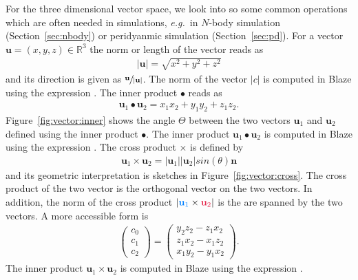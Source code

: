 \documentclass[11pt,fleqn]{book} %
\begin{document}
For the three dimensional vector space, we look into so some common operations which are often needed in simulations, \emph{e.g.}\ in $N$-body simulation (Section~\ref{sec:nbody}) or peridyanmic simulation (Section~\ref{sec:pd}). For a vector $\mathbf{u}=(x,y,z)\in\mathbb{R}^3$ the norm or length of the vector reads as
\begin{align}
\vert\mathbf{u}\vert = \sqrt{x^2+y^2+z^2}
\end{align}
and its direction is given as $\sfrac{\mathbf{u}}{\vert\mathbf{u}\vert}$. The norm of the vector $\vert c \vert$ is computed in Blaze using the expression . The inner product $\bullet$ reads as
\begin{align}
\mathbf{u}_1 \bullet \mathbf{u}_2 = x_1x_2 + y_1y_2 + z_1z_2\text{.}
\end{align}
Figure~\ref{fig:vector:inner} shows the angle $\Theta$ between the two vectors $\mathbf{u}_1$ and $\mathbf{u}_2$ defined using the inner product $\bullet$.  The inner product $\mathbf{u}_1 \bullet \mathbf{u}_2 $ is computed in Blaze using the expression . The cross product $\times$ is defined by
\begin{align}
\mathbf{u}_1 \times \mathbf{u}_2 = \vert\mathbf{u}_1 \vert \vert\mathbf{u}_2 \vert sin(\theta) \mathbf{n}
\end{align}
and its geometric interpretation is sketches in Figure~\ref{fig:vector:cross}. The cross product of the two vector is the orthogonal vector on the two vectors. In addition, the norm of the cross product $\vert\textcolor{azure}{\mathbf{u}_1}\times\textcolor{amaranth}{\mathbf{u}_2}\vert$ is the are spanned by the two vectors. A more accessible form is
\begin{align}
\left( \begin{matrix}
c_0 \\ c_1 \\ c_2
\end{matrix}\right) = \left( \begin{matrix}
y_2 z_2 - z_1 x_2 \\
z_1 x_2 - x_1 z_2 \\
x_1 y_2 - y_1x_2
\end{matrix}\right) \text{.}
\end{align}
The inner product $\mathbf{u}_1 \times \mathbf{u}_2 $ is computed in Blaze using the expression .
\end{document}

